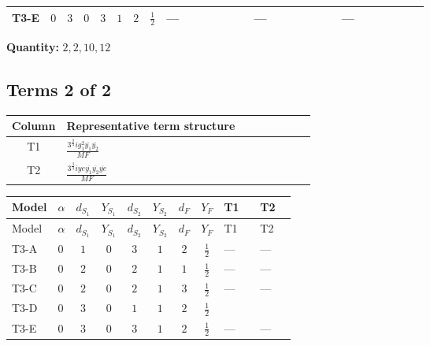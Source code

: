\documentclass[8pt]{article}
\begin{document}
\begin{landscape}
\begin{longtable}{@{}llcccccc >{\raggedright\arraybackslash}p{0.21\linewidth} >{\raggedright\arraybackslash}p{0.21\linewidth} >{\raggedright\arraybackslash}p{0.21\linewidth}@{}}
\midrule
T3-E & $0$ & $3$ & $0$ & $3$ & $1$ & $2$ & $\frac{1}{2}$ & --- & --- & --- \\
\midrule
\bottomrule
\end{longtable}
\clearpage
\noindent\textbf{Quantity: }$\mathrm{2,2,10,12}$\par\smallskip
\subsection*{Terms 2 of 2}
\begin{center}
\begin{tabular}{@{}c >{\raggedright\arraybackslash}p{0.82\linewidth}@{}}
\toprule
Column & Representative term structure \\
\midrule
T1 & \(\displaystyle \frac{3^{\frac{3}{4}} i g_{1}^{2} \overline{y_{1}} \overline{y_{2}}}{MF}\) \\
\midrule
T2 & \(\displaystyle \frac{3^{\frac{3}{4}} i ye \overline{y_{1}} \overline{y_{2}} \overline{ye}}{MF}\) \\
\midrule
\bottomrule
\end{tabular}
\end{center}
\smallskip
\tiny
\begin{longtable}{@{}llcccccc >{\raggedright\arraybackslash}p{0.21\linewidth} >{\raggedright\arraybackslash}p{0.21\linewidth}@{}}
\toprule
Model & $\alpha$ & $d_{S_1}$ & $Y_{S_1}$ & $d_{S_2}$ & $Y_{S_2}$ & $d_F$ & $Y_F$ & T1 & T2 \\
\midrule
\endfirsthead
\toprule
Model & $\alpha$ & $d_{S_1}$ & $Y_{S_1}$ & $d_{S_2}$ & $Y_{S_2}$ & $d_F$ & $Y_F$ & T1 & T2 \\
\midrule
\endhead
T3-A & $0$ & $1$ & $0$ & $3$ & $1$ & $2$ & $\frac{1}{2}$ & --- & --- \\
\midrule
T3-B & $0$ & $2$ & $0$ & $2$ & $1$ & $1$ & $\frac{1}{2}$ & --- & --- \\
\midrule
T3-C & $0$ & $2$ & $0$ & $2$ & $1$ & $3$ & $\frac{1}{2}$ & --- & --- \\
\midrule
T3-D & $0$ & $3$ & $0$ & $1$ & $1$ & $2$ & $\frac{1}{2}$ & \scriptsize\adjustbox{max width=\linewidth}{$\begin{gathered} - \frac{3^{\frac{3}{4}} i g_{1}^{2} \overline{y_{1}} \overline{y_{2}}}{8 MF}\end{gathered}$} & \scriptsize\adjustbox{max width=\linewidth}{$\begin{gathered} \frac{3^{\frac{3}{4}} i ye \overline{y_{1}} \overline{y_{2}} \overline{ye}}{12 MF}\end{gathered}$} \\
\midrule
T3-E & $0$ & $3$ & $0$ & $3$ & $1$ & $2$ & $\frac{1}{2}$ & --- & --- \\
\midrule
\bottomrule
\end{longtable}
\clearpage

\end{landscape}
\end{document}
